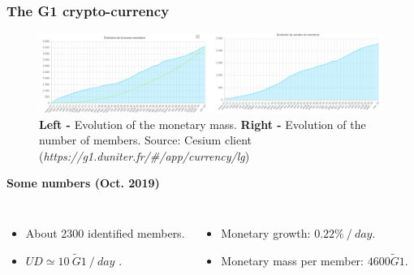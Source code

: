 \documentclass{beamer}
\begin{document}

\begin{frame}
\frametitle{The G1 crypto-currency}

\begin{figure}
\includegraphics[width=\linewidth]{./figures/g1_evolution}
\caption{\textbf{Left -} Evolution of the monetary mass. \textbf{Right -} Evolution of the number of members. Source: Cesium client (\textit{https://g1.duniter.fr/\#/app/currency/lg})}
\end{figure}

\smallskip

\textbf{Some numbers (Oct. 2019)}

\begin{columns}[c]

\begin{itemize}
\item About 2300 identified members.
\item $UD \simeq 10\ \tilde{G}1\ /\ day$ .
\end{itemize}

\begin{itemize}
\item Monetary growth: $0.22\%\ /\ day$.
\item Monetary mass per member: $4600 \tilde{G}1 $.
\end{itemize}
\end{columns}

\end{frame}

\end{document}
